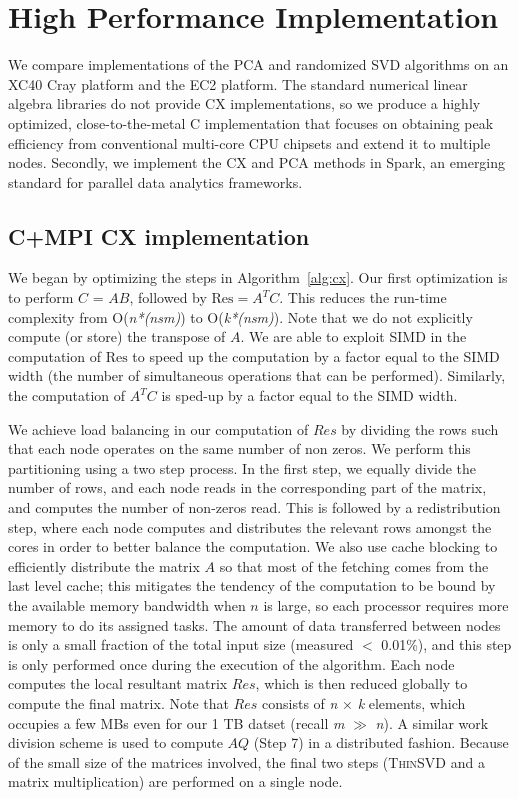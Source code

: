 
\section{High Performance Implementation}
\label{sec:implementation}

We compare implementations of the PCA and randomized SVD algorithms on 
an XC40 Cray platform and the EC2 platform.  The standard
numerical linear algebra libraries do not provide CX implementations, so we
produce a highly optimized, close-to-the-metal C implementation that focuses on
obtaining peak efficiency from conventional multi-core CPU chipsets and extend
it to multiple nodes.  Secondly, we implement the CX and PCA methods in Spark,
an emerging standard for parallel data analytics frameworks. 

\subsection {C+MPI CX implementation}
\label{sxn:single_node_opt}

We began by optimizing the steps in Algorithm~\ref{alg:cx}. Our first optimization is to perform $C$ = $AB$, 
followed by $\mathrm{Res} = A^TC$. This reduces the run-time complexity from
O({\it{n*(nsm)}}) to O({\it{k*(nsm)}}). Note that we do not
explicitly compute (or store) the transpose of $A$. We are able to exploit SIMD in the
computation of $\mathrm{Res}$ to speed up the computation by a factor equal to
the SIMD width (the number of simultaneous operations that can be performed).
Similarly, the computation of $A^TC$ is sped-up by a factor equal to the SIMD width.

We achieve load balancing in our computation of $Res$ by dividing
the rows such that each node operates on the same number of non zeros.  We
perform this partitioning using a two step process. In the first step, we
equally divide the number of rows, and each node reads in the corresponding
part of the matrix, and computes the number of non-zeros read. This is followed
by a redistribution step, where each node computes and distributes the relevant
rows amongst the cores in order to better balance the computation. We also use
cache blocking to efficiently distribute the matrix $A$ so that most of the
fetching comes from the last level cache; this mitigates the tendency of the
computation to be bound by the available memory bandwidth when $n$ is large, so
each processor requires more memory to do its assigned tasks. The amount of
data transferred between nodes is only a small fraction of the total input size
(measured $<$ 0.01\%), and this step is only performed once during the
execution of the algorithm. Each node computes the local resultant matrix
$Res$, which is then reduced globally to compute the final matrix. Note that
$Res$ consists of {\it{n}} $\times$ {\it{k}} elements, which occupies a few MBs
even for our 1 TB datset (recall {\it{m}} $\gg$ {\it{n}}).  A similar work
division scheme is used to compute $AQ$ (Step 7) in a distributed fashion.
Because of the small size of the matrices involved, the final two steps
(\textsc{ThinSVD} and a matrix multiplication) are performed on a single node.

